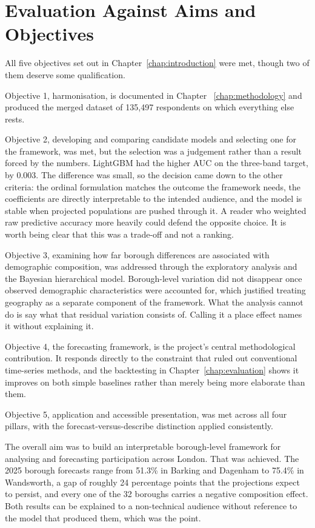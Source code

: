 \documentclass[ %
                    author={Ashrey Ashrey, Sanya Kapoor, Trisha Sharma, Yash Bhooshan Pandloskar},
                supervisor={Dr. Dalila O’Grady},
                    degree={MSc},
                     title={Using machine learning to forecast physical activity participation, volunteering and activity patterns in London},
                  subtitle={},
                      type={},
                      year={2021}]{dissertation}
\begin{document}
\section{Evaluation Against Aims and Objectives}

All five objectives set out in Chapter~\ref{chap:introduction} were met, though two of them deserve some qualification.

Objective 1, harmonisation, is documented in Chapter ~\ref{chap:methodology} and produced the merged dataset of 135{,}497 respondents on which everything else rests.

Objective 2, developing and comparing candidate models and selecting one for the framework, was met, but the selection was a judgement rather than a result forced by the numbers. LightGBM had the higher AUC on the three-band target, by 0.003. The difference was small, so the decision came down to the other criteria: the ordinal formulation matches the outcome the framework needs, the coefficients are directly interpretable to the intended audience, and the model is stable when projected populations are pushed through it. A reader who weighted raw predictive accuracy more heavily could defend the opposite choice. It is worth being clear that this was a trade-off and not a ranking.

Objective 3, examining how far borough differences are associated with
demographic composition, was addressed through the exploratory analysis and the Bayesian hierarchical model. Borough-level variation did not disappear once observed demographic characteristics were accounted for, which justified treating geography as a separate component of the framework. What the analysis cannot do is say what that residual variation consists of. Calling it a place effect names it without explaining it.

Objective 4, the forecasting framework, is the project's central methodological contribution. It responds directly to the constraint that ruled out conventional time-series methods, and the backtesting in Chapter~\ref{chap:evaluation} shows it improves on both simple baselines rather than merely being more elaborate than them.

Objective 5, application and accessible presentation, was met across all four pillars, with the forecast-versus-describe distinction applied consistently.

The overall aim was to build an interpretable borough-level framework for
analysing and forecasting participation across London. That was achieved. The 2025 borough forecasts range from 51.3\% in Barking and Dagenham to 75.4\% in Wandsworth, a gap of roughly 24 percentage points that the projections expect to persist, and every one of the 32 boroughs carries a negative composition effect. Both results can be explained to a non-technical audience without reference to the model that produced them, which was the point.
\end{document}

